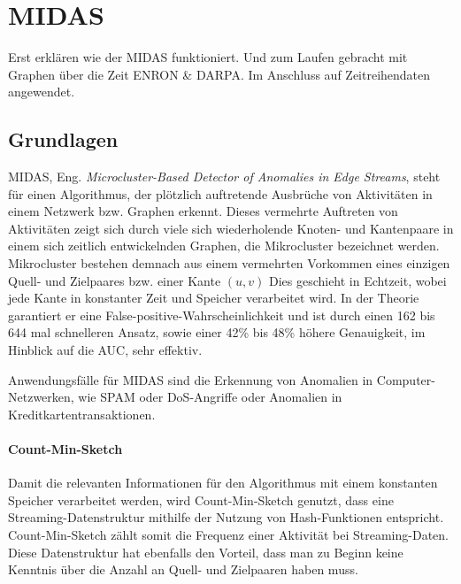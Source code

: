 \newpage
\chapter{MIDAS}
\label{chap:mc}

Erst erklären wie der MIDAS funktioniert. Und zum Laufen gebracht mit Graphen über die Zeit ENRON \& DARPA. Im Anschluss auf Zeitreihendaten angewendet.


\section{Grundlagen}
\label{sec:mc-gl}

MIDAS, Eng. \textit{Microcluster-Based Detector of Anomalies in Edge Streams}, steht für einen Algorithmus, der plötzlich auftretende Ausbrüche von Aktivitäten in einem Netzwerk bzw. Graphen erkennt. Dieses vermehrte Auftreten von Aktivitäten zeigt sich durch viele sich wiederholende Knoten- und Kantenpaare in einem sich zeitlich entwickelnden Graphen, die Mikrocluster bezeichnet werden. Mikrocluster bestehen demnach aus einem vermehrten Vorkommen eines einzigen Quell- und Zielpaares bzw. einer Kante $(u,v)$   Dies geschieht in Echtzeit, wobei jede Kante in konstanter Zeit und Speicher verarbeitet wird. In der Theorie garantiert er eine False-positive-Wahrscheinlichkeit und ist durch einen 162 bis 644 mal schnelleren Ansatz, sowie einer 42\% bis 48\% höhere Genauigkeit, im Hinblick auf die AUC, sehr effektiv. \citep[vgl.][S.~1]{MIDAS}

Anwendungsfälle für MIDAS sind die Erkennung von Anomalien in Computer-Netzwerken, wie SPAM oder DoS-Angriffe oder Anomalien in Kreditkartentransaktionen.


\subsubsection{Count-Min-Sketch}
\label{sec:mc-gl-cms}
Damit die relevanten Informationen für den Algorithmus mit einem konstanten Speicher verarbeitet werden, wird Count-Min-Sketch genutzt, dass eine Streaming-Datenstruktur mithilfe der Nutzung von Hash-Funktionen entspricht. Count-Min-Sketch zählt somit die Frequenz einer Aktivität bei Streaming-Daten. Diese Datenstruktur hat ebenfalls den Vorteil, dass man zu Beginn keine Kenntnis über die Anzahl an Quell- und Zielpaaren haben muss.

